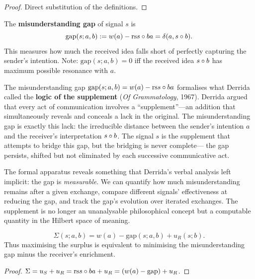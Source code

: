 \begin{proof}
Direct substitution of the definitions.
\end{proof}

\begin{definition}
\label{def:misunderstanding}
The \textbf{misunderstanding gap} of signal $s$ is
\[
  \mathrm{gap}(s; a, b) := w(a) - \mathrm{rs}{s \circ b}{a}
  = \delta(a, s \circ b).
\]
This measures how much the received idea falls short of perfectly capturing
the sender's intention.  Note: $\mathrm{gap}(s; a, b) = 0$ iff the received
idea $s \circ b$ has maximum possible resonance with $a$.
\end{definition}

\begin{remark}
\label{rem:ch13:gap_derrida_supplement}
The misunderstanding gap $\mathrm{gap}(s; a, b) = w(a) - \mathrm{rs}{s \circ b}{a}$
formalises what Derrida called the \textbf{logic of the supplement} (\emph{Of
Grammatology}, 1967).  Derrida argued that every act of communication
involves a ``supplement''---an addition that simultaneously reveals and
conceals a lack in the original.  The misunderstanding gap is exactly this
lack: the irreducible distance between the sender's intention $a$ and the
receiver's interpretation $s \circ b$.  The signal $s$ is the supplement
that attempts to bridge this gap, but the bridging is never complete---
the gap persists, shifted but not eliminated by each successive
communicative act.

The formal apparatus reveals something that Derrida's verbal analysis
left implicit: the gap is \emph{measurable}.  We can quantify how much
misunderstanding remains after a given exchange, compare different signals'
effectiveness at reducing the gap, and track the gap's evolution over
iterated exchanges.  The supplement is no longer an unanalysable
philosophical concept but a computable quantity in the Hilbert space of
meaning.
\end{remark}



\begin{theorem}
\label{thm:gap-surplus}
\[
  \Sigma(s; a, b) = w(a) - \mathrm{gap}(s; a, b) + u_R(s; b).
\]
Thus maximising the surplus is equivalent to minimising the misunderstanding
gap minus the receiver's enrichment.
\end{theorem}

\begin{proof}
$\Sigma = u_S + u_R = \mathrm{rs}{s \circ b}{a} + u_R
= (w(a) - \mathrm{gap}) + u_R$.
\end{proof}

